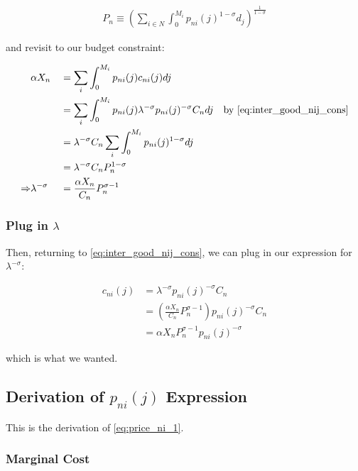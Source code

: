 \documentclass[10pt]{article}
\begin{document}
\begin{align}
    P_n \equiv \left(\sum_{i \in N} \int_0^{M_i} p_{n i}(j)^{1-\sigma} d_j \right)^{\frac{1}{1-\sigma}} \label{eq:price_index_p_n}
\end{align}

and revisit to our budget constraint:

\begin{alignat}{2}
    &\alpha X_n && = \sum_i \int_{0}^{M_i} p_{n i}(j) c_{n i}(j) d j \\
    &&&= \sum_i \int_{0}^{M_i} p_{n i}(j) \lambda^{-\sigma} p_{ni}(j)^{-\sigma} C_n d j \quad \text{by \eqref{eq:inter_good_nij_cons}} \\
    &&&= \lambda^{-\sigma} C_n \sum_i \int_{0}^{M_i} p_{n i}(j)^{1-\sigma} d j \\
    &&& = \lambda^{-\sigma} C_n P_n^{1-\sigma} \\
    \Rightarrow &\lambda^{-\sigma} &&= \frac{\alpha X_n}{C_n} P_n^{\sigma-1} \\
\end{alignat}

\subsubsection{Plug in $\lambda$}

Then, returning to \eqref{eq:inter_good_nij_cons}, we can plug in our expression for $\lambda^{-\sigma}$:

\begin{align}
    c_{n i}(j) &= \lambda^{-\sigma} p_{ni}(j)^{-\sigma} C_n \\
    &= \left(\frac{\alpha X_n}{C_n} P_n^{\sigma-1}\right) p_{ni}(j)^{-\sigma} C_n \\
    &= \alpha X_n P_n^{\sigma-1} p_{ni}(j)^{-\sigma}
\end{align}

which is what we wanted.

\subsection{Derivation of $p_{n i}(j)$ Expression}
\label{sec:price_ni_1}
This is the derivation of \eqref{eq:price_ni_1}.

\subsubsection{Marginal Cost}
\end{document}
